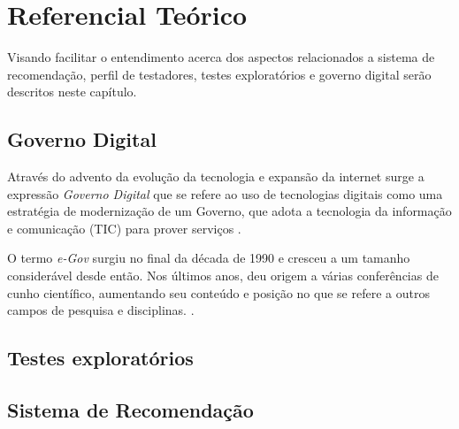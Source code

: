 
\chapter[Referencial Teórico]{Referencial Teórico}

Visando facilitar o entendimento acerca dos aspectos relacionados a sistema de recomendação, perfil de testadores,
testes exploratórios e governo digital serão descritos neste capítulo.


\section{Governo Digital}

Através do advento da evolução da tecnologia e expansão da internet surge a expressão \textit{Governo Digital}
que se refere ao uso de tecnologias digitais como uma estratégia de modernização de um Governo, que adota a tecnologia da
informação e comunicação (TIC) para prover serviços \cite{fang2002government}.

O termo \textit{e-Gov} surgiu no final da década de 1990 e cresceu a um tamanho considerável desde então.
Nos últimos anos, deu origem a várias conferências de cunho científico, aumentando seu conteúdo e posição no que se refere a
outros campos de pesquisa e disciplinas. \cite{gronlund2005introducing}.




\section{Testes exploratórios}


\section{Sistema de Recomendação}
